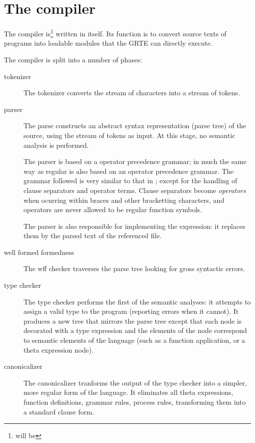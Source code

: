 \section{The \go compiler}
\label{howitworks:compiler}

The \go compiler is\footnote{will be} written in \go itself. Its function is to convert source texts of \go programs into loadable modules that the GRTE can directly execute.

The \go compiler is split into a number of phases:
\begin{description}
\item[tokenizer]
The tokenizer converts the stream of characters into a stream of tokens. 
\item[parser]
The parse constructs an abstract syntax representation (parse tree) of the \go source, using the stream of tokens as input. At this stage, no semantic analysis is performed.

The parser is based on a operator precedence grammar; in much the same way as regular \prolog is also based on an operator precedence grammar. The grammar followed is very similar to that in \prolog; except for the handling of clause separators and operator terms. Clause separators become \emph{operators} when ocurring within braces and other bracketting characters, and operators are never allowed to be regular function symbols.

The parser is also responsible for implementing the  expression: it replaces them by the parsed text of the referenced file.

\item[well formed formedness]
The wff checker traverses the parse tree looking for gross syntactic errors.

\item[type checker]
The type checker performs the first of the semantic analyses: it attempts to assign a valid type to the program (reporting errors when it cannot). It produces a new tree that mirrors the parse tree except that each node is decorated with a type expression and the elements of the node correspond to semantic elements of the \go language (such as a function application, or a theta expression node).

\item[canonicalizer]
The canonicalizer tranforms the output of the type checker into a simpler, more regular form of the language. It eliminates all theta expressions, function definitions, grammar rules, process rules, transforming them into a standard clause form.


\end{description}
